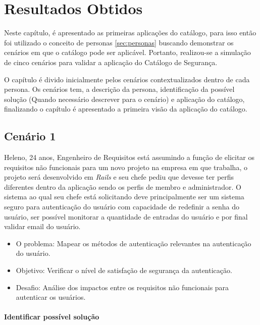 \chapter{Resultados Obtidos}
\label{chap:resultados obtidos}

Neste capítulo, é apresentado as primeiras aplicações do catálogo, para isso então foi utilizado o conceito de personas \ref{sec:personas} buscando demonstrar os cenários em que o catálogo pode ser aplicável. Portanto, realizou-se a simulação de cinco cenários para validar a aplicação do Catálogo de Segurança. 

O capítulo é divido inicialmente pelos cenários contextualizados dentro de cada persona. Os cenários tem, a descrição da persona, identificação da possível solução (Quando necessário descrever para o cenário) e aplicação do catálogo, finalizando o capítulo é apresentado a primeira visão da aplicação do catálogo.  


\section{Cenário 1}
\label{subsec:persona1}

Heleno, 24 anos, Engenheiro de Requisitos está assumindo a função de elicitar os requisitos não funcionais para um novo projeto na empresa em que trabalha, o projeto será desenvolvido em \textit{Rails} e seu chefe pediu que devesse ter perfis diferentes dentro da aplicação sendo os perfis de membro e administrador. O sistema ao qual seu chefe está solicitando deve principalmente ser um sistema seguro para autenticação do usuário com capacidade de redefinir a senha do usuário, ser possível monitorar a quantidade de entradas do usuário e por final validar email do usuário.

\begin{itemize}
	\item O problema: Mapear os métodos de autenticação relevantes na autenticação do usuário. 
	\item Objetivo: Verificar o nível de satisfação de segurança da autenticação. 
	\item Desafio: Análise dos impactos entre os requisitos não funcionais para autenticar os usuários.
\end{itemize}


\subsubsection{Identificar possível solução}


